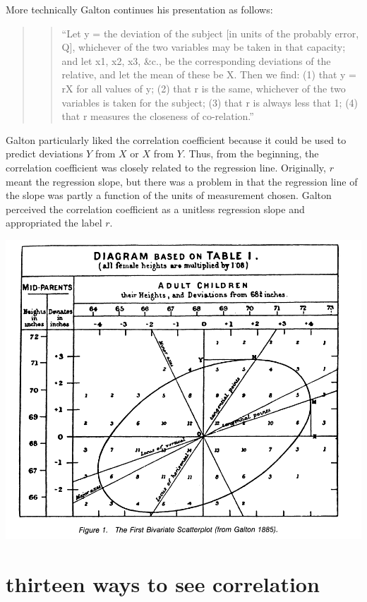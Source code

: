 \documentclass[
]{report}
\begin{document}
More technically Galton continues his presentation as follows:

\begin{quote}
\begin{quote}
``Let y = the deviation of the subject {[}in units of the probably error, Q{]}, whichever of the two variables may be taken in that capacity; and let x1, x2, x3, \&c., be the corresponding deviations of the relative, and let the mean of these be X. Then we find: (1) that y = rX for all values of y; (2) that r is the same, whichever of the two variables is taken for the subject; (3) that r is always less that 1; (4) that r measures the closeness of co-relation.''
\end{quote}
\end{quote}

Galton particularly liked the correlation coefficient because it could be used to predict deviations \(Y\) from \(X\) or \(X\) from \(Y\). Thus, from the beginning, the correlation coefficient was closely related to the regression line. Originally, \(r\) meant the regression slope, but there was a problem in that the regression line of the slope was partly a function of the units of measurement chosen. Galton perceived the correlation coefficient as a unitless regression slope and appropriated the label \(r\).

\includegraphics{galton.PNG}

\hypertarget{thirteen-ways-to-see-correlation-13cor}{%
\section{\texorpdfstring{thirteen ways to see correlation \citep{13cor}}{thirteen ways to see correlation {[}@13cor{]}}}\label{thirteen-ways-to-see-correlation-13cor}}
\end{document}
